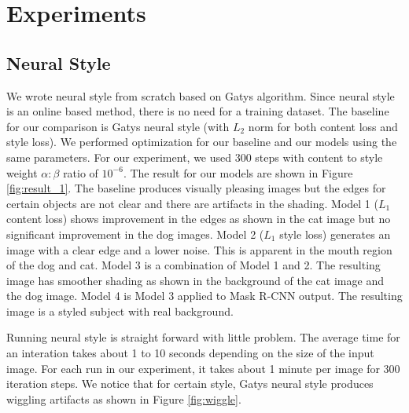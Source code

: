 \documentclass{article}
\begin{document}
\section{Experiments}

\subsection{Neural Style}
We wrote neural style from scratch based on Gatys algorithm. Since neural style is an online based method, there is no need for a training dataset. The baseline for our comparison is Gatys neural style (with $L_2$ norm for both content loss and style loss). We performed optimization for our baseline and our models using the same parameters. For our experiment, we used 300 steps with content to style weight $\alpha:\beta$ ratio of $10^{-6}$. The result for our models are shown in Figure \ref{fig:result_1}. The baseline produces visually pleasing images but the edges for certain objects are not clear and there are artifacts in the shading. Model 1 ($L_1$ content loss) shows improvement in the edges as shown in the cat image but no significant improvement in the dog images. Model 2 ($L_1$ style loss) generates an image with a clear edge and a lower noise. This is apparent in the mouth region of the dog and cat. Model 3 is a combination of Model 1 and 2. The resulting image has smoother shading as shown in the background of the cat image and the dog image. Model 4 is Model 3 applied to Mask R-CNN output. The resulting image is a styled subject with real background.

Running neural style is straight forward with little problem. The average time for an interation takes about 1 to 10 seconds depending on the size of the input image. For each run in our experiment, it takes about 1 minute per image for 300 iteration steps. We notice that for certain style, Gatys neural style produces wiggling artifacts as shown in Figure \ref{fig:wiggle}.
\end{document}
